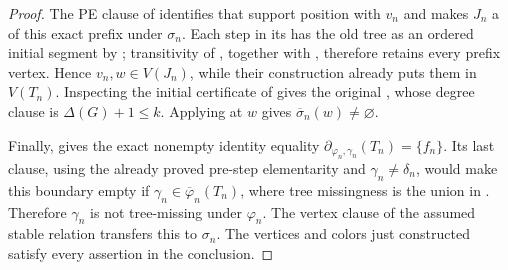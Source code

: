 \begin{proof}
The PE clause of  identifies that support position
with $v_n$ and makes $J_n$ a  of this exact
prefix under $\sigma_n$.  Each step in its
 has the old tree as an ordered
initial segment by ; transitivity of
, together with
, therefore retains every prefix vertex.
Hence $v_n,w\in V(J_n)$, while their construction already puts them in
$V(T_n)$.  Inspecting the initial certificate of
 gives the original
, whose degree clause is $\Delta(G)+1\leq k$.
Applying  at $w$ gives
$\overline\sigma_n(w)\ne\varnothing$.

Finally,  gives the exact nonempty
identity equality
$\partial_{\varphi_n,\gamma_n}(T_n)=\{f_n\}$.  Its last clause, using
the already proved pre-step elementarity and
$\gamma_n\ne\delta_n$, would make this boundary empty if
$\gamma_n\in\overline\varphi_n(T_n)$, where tree missingness is the
union in .  Therefore $\gamma_n$ is not
tree-missing under $\varphi_n$.  The vertex clause of the assumed stable
relation transfers this to $\sigma_n$.  The vertices and colors just
constructed satisfy every assertion in the conclusion.
\end{proof}
